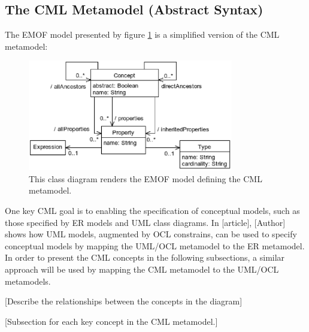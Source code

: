 \pagebreak[5]
\subsection{The CML Metamodel (Abstract Syntax)}\label{subsec:metamodel}

The EMOF \cite{mof} model presented by figure \ref{fig:metamodel} is a simplified version of the CML metamodel:

\begin{figure}
\centering
\includegraphics[width=0.8\textwidth]{language/diagram-metamodel}
\caption{This class diagram renders the EMOF \cite{mof} model defining the CML metamodel.}
\label{fig:metamodel}
\end{figure}


One key CML goal is to enabling the specification of conceptual models, such as those specified by ER \cite{er} models and UML \cite{url} class diagrams. In [article], [Author] shows how UML models, augmented by OCL constrains, can be used to specify conceptual models by mapping the UML/OCL metamodel to the ER metamodel. In order to present the CML concepts in the following subsections, a similar approach will be used by mapping the CML metamodel to the UML/OCL metamodels.

[Describe the relationships between the concepts in the diagram]

[Subsection for each key concept in the CML metamodel.]